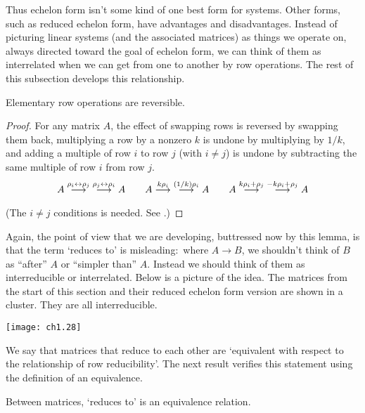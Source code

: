 Thus echelon form isn't some kind of one best form for systems.
Other forms, such as reduced echelon form,  have advantages and
disadvantages.
Instead of picturing linear systems (and the associated matrices) 
as things we operate on, 
always directed toward the goal of echelon form, we can think of 
them as interrelated when
we can get from one to another by row operations.
The rest of this subsection develops this relationship.

\begin{lemma} \label{le:RowOpsRev}
Elementary row operations are reversible.
\end{lemma}

\begin{proof}
For any matrix \( A \),
the effect of swapping rows is reversed by swapping them back,
multiplying a row by a nonzero \( k \) is undone by multiplying by
$1/k$,
and adding a multiple of row \( i \) to row \( j \) (with $i\neq j$)
is undone by subtracting the same multiple of row \( i \) from row \( j \).
\begin{equation*}
      A
     \mathrel{ \mathop{\longrightarrow}\limits^{\rho_i\leftrightarrow\rho_j\mathstrut}_{ \begin{subarray}{l} \relax \end{subarray}}}
     \;\mathrel{ \mathop{\longrightarrow}\limits^{\rho_j\leftrightarrow\rho_i\mathstrut}_{ \begin{subarray}{l} \relax \end{subarray}}}
      A
  \qquad
        A
     \mathrel{ \mathop{\longrightarrow}\limits^{k\rho_i\mathstrut}_{ \begin{subarray}{l} \relax \end{subarray}}}
     \;\mathrel{ \mathop{\longrightarrow}\limits^{(1/k)\rho_i\mathstrut}_{ \begin{subarray}{l} \relax \end{subarray}}}
      A
  \qquad
        A
     \mathrel{ \mathop{\longrightarrow}\limits^{k\rho_i+\rho_j\mathstrut}_{ \begin{subarray}{l} \relax \end{subarray}}}
     \;\mathrel{ \mathop{\longrightarrow}\limits^{-k\rho_i+\rho_j\mathstrut}_{ \begin{subarray}{l} \relax \end{subarray}}}
      A                          
\end{equation*}
(The $i\neq j$ conditions is needed.
See .)
\end{proof}

Again, the point of view that we are developing, buttressed now by this lemma,
is that the term `reduces to' is misleading:~where
\( A\longrightarrow B \), we shouldn't think of \( B \) as
``after'' \( A \) or ``simpler than'' $A$.
Instead we should think of them as interreducible or interrelated.
Below is a picture of the idea.
The matrices from the start of this section and their
reduced echelon form version are shown in a cluster.
They are all interreducible. 
\begin{center}  
  \texttt{[image: ch1.28]}
\end{center}

We say 
that matrices that reduce to each other are `equivalent with respect
to the relationship of row reducibility'.
The next result verifies this statement using the definition of 
an equivalence.

\begin{lemma}
Between matrices, `reduces to' is an equivalence re\-la\-tion.
\end{lemma}

